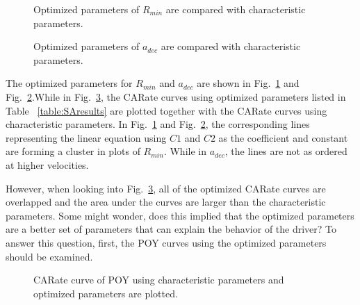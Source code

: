 \begin{figure}[htbp!]
\begin{center}
\end{center}
\caption{Optimized parameters of $R_{min}$ are compared with characteristic parameters.}
\label{fig:RMINParamOptimChara} 
\end{figure}

\begin{figure}[htbp!]
\begin{center}
\end{center}
\caption{Optimized parameters of $a_{dec}$ are compared with characteristic parameters.}
\label{fig:ADECParamOptimChara} 
\end{figure}

The optimized parameters for $R_{min}$ and $a_{dec}$ are shown in Fig.~\ref{fig:RMINParamOptimChara} and Fig.~\ref{fig:ADECParamOptimChara}.While in Fig.~\ref{fig:CAR_optimParam}, the CARate curves using optimized parameters listed in Table ~\ref{table:SAresults} are plotted together with the CARate curves using characteristic parameters. In Fig.~\ref{fig:RMINParamOptimChara} and Fig.~\ref{fig:ADECParamOptimChara}, the corresponding lines representing the linear equation using ${C1}$ and $C2$ as the coefficient and constant are forming a cluster in plots of $R_{min}$. While in $a_{dec}$, the lines are not as ordered at higher velocities. 


However, when looking into Fig.~\ref{fig:CAR_optimParam}, all of the optimized CARate curves are overlapped and the area under the curves are larger than the characteristic parameters. Some might wonder, does this implied that the optimized parameters are a better set of parameters that can explain the behavior of the driver? To answer this question, first, the POY curves using the optimized parameters should be examined.

\begin{figure}[htbp!]
\begin{center}
\end{center}
\caption{CARate curve of POY using characteristic parameters and optimized parameters are plotted.}
\label{fig:CAR_optimParam} 
\end{figure}

